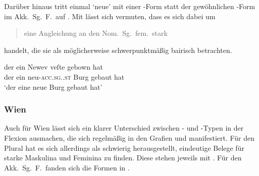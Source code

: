 Darüber hinaus tritt einmal  `neue' mit einer -Form
statt der gewöhnlichen -Form im Akk.\ Sg.\ F.\ auf
. Mit \citet{ksw2} lässt sich vermuten, dass es sich
dabei um \blockcquote[270]{ksw2}{\mbox{eine} Angleichung an den
Nom.~Sg.~fem.~stark} handelt, die sie als möglicherweise schwerpunktmäßig
bairisch betrachten.

\begin{exe}
	\ex \label{ex:adjsalzbgirr_1}
		\gll der ein Newev veſte gebown hat \\
			der ein neu-\textsc{acc.sg.\FemI.st} Burg gebaut hat \\
		\trans `der eine neue Burg gebaut hat'
			\parencites(Nr.~695, Salzburg, um 1285)[103,11]{cao2}
\end{exe}

\subsubsection{Wien}
\label{par:adjwien}
Auch für Wien lässt sich ein klarer Unterschied zwischen - und
-Typen in der Flexion ausmachen, die sich regelmäßig in den Grafien
 und  manifestiert. Für den Plural hat es sich
allerdings als schwierig herausgestellt, eindeutige Belege für starke Maskulina
und Feminina zu finden. Diese stehen jeweils mit 
. Für den Akk.\ Sg.\ F.\ fanden sich die Formen in
.

